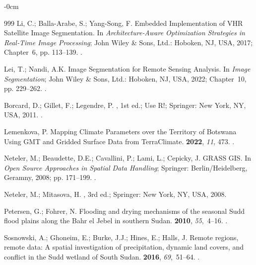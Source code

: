 \documentclass[analytics,article,accept,pdftex,moreauthors]{Definitions/mdpi}
\begin{document}
\begin{adjustwidth}{-\extralength}{0cm}
\begin{thebibliography}{999}
Li, C.; Balla-Arabe, S.; Yang-Song, F. Embedded Implementation of VHR
  Satellite Image Segmentation.
\newblock In {\em Architecture‐Aware Optimization Strategies in Real‐Time
  Image Processing}; John Wiley \& Sons, Ltd.: Hoboken, NJ, USA,  %
  2017; Chapter~6, pp. 113--139.
.

Lei, T.; Nandi, A.K. Image Segmentation for Remote Sensing Analysis.
\newblock In {\em Image Segmentation}; John Wiley \& Sons, Ltd.: Hoboken, NJ, USA, 2022; %
  Chapter~10, pp. 229--262.
.

Borcard, D.; Gillet, F.; Legendre, P.
, 1st ed.; Use R!; Springer: New York,
  NY, USA, 2011.
.

Lemenkova, P.
\newblock Mapping Climate Parameters over the Territory of Botswana Using GMT
  and Gridded Surface Data from TerraClimate.
 {\bf 2022}, {\em
  11}, 473.
.

Neteler, M.; Beaudette, D.E.; Cavallini, P.; Lami, L.; Cepicky, J. GRASS GIS.
\newblock In {\em Open Source Approaches in Spatial Data Handling}; Springer: Berlin/Heidelberg, Geramny, 2008; pp. 171--199.
.

Neteler, M.; Mitasova, H.
, 3rd ed.; Springer: New
  York, NY, USA,  2008.

Petersen, G.; Fohrer, N.
\newblock Flooding and drying mechanisms of the seasonal Sudd flood plains
  along the Bahr el Jebel in southern Sudan.
 {\bf 2010}, {\em 55},~4--16.
.

Sosnowski, A.; Ghoneim, E.; Burke, J.J.; Hines, E.; Halls, J.
\newblock Remote regions, remote data: A spatial investigation of
  precipitation, dynamic land covers, and conflict in the Sudd wetland of South
  Sudan.
 {\bf 2016}, {\em 69},~51--64.
.


\end{thebibliography}
\end{adjustwidth}
\end{document}
